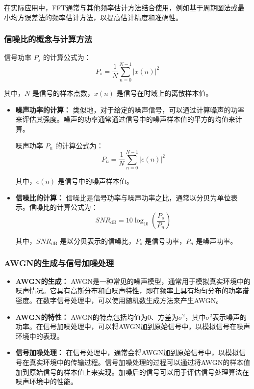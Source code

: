 \documentclass[a4paper,12pt]{article}
\begin{document}
在实际应用中，FFT通常与其他频率估计方法结合使用，例如基于周期图法或最小均方误差法的频率估计方法，以提高估计精度和准确性。

\subsubsection{信噪比的概念与计算方法}
信号功率 $P_s$ 的计算公式为： 
\[ P_s = \frac{1}{N} \sum_{n=0}^{N-1} |x(n)|^2 \]

其中，$N$ 是信号的样本点数，$x(n)$ 是信号在时域上的离散样本值。
\begin{itemize}
    \item \textbf{噪声功率的计算：} 类似地，对于给定的噪声信号，可以通过计算噪声的功率来评估其强度。噪声的功率通常通过信号中的噪声样本值的平方的均值来计算。

    噪声功率 $P_n$ 的计算公式为： 
\[ P_n = \frac{1}{N} \sum_{n=0}^{N-1} |e(n)|^2 \]

其中，$e(n)$ 是信号中的噪声样本值。

    \item \textbf{信噪比的计算：} 信噪比是信号功率与噪声功率之比，通常以分贝为单位表示。信噪比的计算公式为：
    \begin{equation}
        SNR_{\text{dB}} = 10 \log_{10} \left( \frac{P_s}{P_n} \right)
    \end{equation}

其中，$SNR_{\text{dB}}$ 是以分贝表示的信噪比，$P_s$ 是信号功率，$P_n$ 是噪声功率。
\end{itemize}



\subsubsection{AWGN的生成与信号加噪处理}
\begin{itemize}
    \item \textbf{AWGN的生成：} AWGN是一种常见的噪声模型，通常用于模拟真实环境中的噪声情况。它具有高斯分布和白噪声特性，即在频率上具有均匀分布的功率谱密度。在数字信号处理中，可以使用随机数生成方法来产生AWGN。
    
    \item \textbf{AWGN的特性：} AWGN的特点包括均值为0、方差为$\sigma^2$，其中$\sigma^2$表示噪声的功率。在信号加噪处理中，可以将AWGN加到原始信号中，以模拟信号在噪声环境中的表现。
    
    \item \textbf{信号加噪处理：} 在信号处理中，通常会将AWGN加到原始信号中，以模拟信号在真实环境中的传输过程。信号加噪处理的过程可以通过将AWGN的样本值加到原始信号的样本值上来实现。加噪后的信号可以用于评估信号处理算法在噪声环境中的性能。
\end{itemize}
\end{document}
